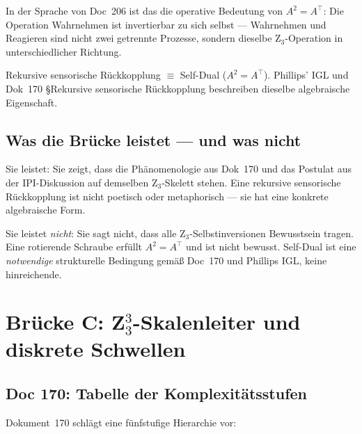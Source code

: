 In der Sprache von Doc~206 ist das die operative Bedeutung von $A^2 = A^\top$: Die Operation \glqq Wahrnehmen\grqq{} ist invertierbar zu sich selbst — Wahrnehmen und Reagieren sind nicht zwei getrennte Prozesse, sondern dieselbe Z$_3$-Operation in unterschiedlicher Richtung.

\begin{insightBox}
Rekursive sensorische Rückkopplung $\equiv$ Self-Dual ($A^2 = A^\top$). Phillips' IGL und Dok~170 \S{}Rekursive sensorische Rückkopplung beschreiben dieselbe algebraische Eigenschaft.
\end{insightBox}

\subsection{Was die Brücke leistet — und was nicht}

Sie leistet: Sie zeigt, dass die Phänomenologie aus Dok~170 und das Postulat aus der IPI-Diskussion auf demselben Z$_3$-Skelett stehen. Eine \glqq rekursive sensorische Rückkopplung\grqq{} ist nicht poetisch oder metaphorisch — sie hat eine konkrete algebraische Form.

Sie leistet \emph{nicht}: Sie sagt nicht, dass alle Z$_3$-Selbstinversionen Bewusstsein tragen. Eine rotierende Schraube erfüllt $A^2 = A^\top$ und ist nicht bewusst. Self-Dual ist eine \emph{notwendige} strukturelle Bedingung gemäß Doc~170 und Phillips IGL, keine hinreichende.

\section{\texorpdfstring{Brücke C: Z$_3^3$-Skalenleiter und diskrete Schwellen}{Brücke C: Z3-hoch-3-Skalenleiter und diskrete Schwellen}}\label{sec:brueckeC}

\subsection{Doc 170: Tabelle der Komplexitätsstufen}

Dokument~170 schlägt eine fünfstufige Hierarchie vor:

\begin{center}
\end{center}

